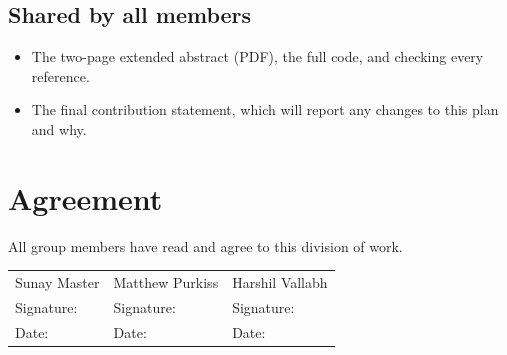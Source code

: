 \documentclass[11pt,a4paper]{article}
\begin{document}
\subsection*{Shared by all members}
\begin{itemize}
  \item The two-page extended abstract (PDF), the full code, and checking every reference.
  \item The final contribution statement, which will report any changes to this plan and why.
\end{itemize}

\section*{Agreement}

All group members have read and agree to this division of work.

\vspace{1em}
\begin{tabularx}{\textwidth}{@{}X X X@{}}
Sunay Master & Matthew Purkiss & Harshil Vallabh \\[1.6em]
Signature: \hrulefill & Signature: \hrulefill & Signature: \hrulefill \\[1em]
Date: \hrulefill & Date: \hrulefill & Date: \hrulefill \\
\end{tabularx}
\end{document}
